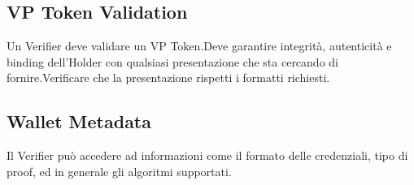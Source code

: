 \subsection{VP Token Validation}
Un Verifier deve validare un VP Token.Deve garantire integrità, autenticità e binding dell'Holder con qualsiasi presentazione che sta cercando di fornire.Verificare che la presentazione rispetti i formatti richiesti.

\subsection{Wallet Metadata}
Il Verifier può accedere ad informazioni come il formato delle credenziali, tipo di proof, ed in generale gli algoritmi supportati.
